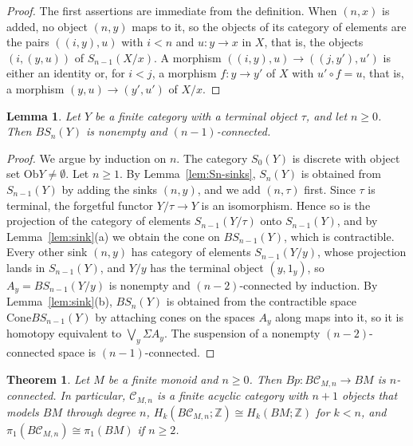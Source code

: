 \documentclass[12pt]{amsart}
\newtheorem{theorem}[teo]{Theorem}
\newtheorem{lemma}[teo]{Lemma}
\theoremstyle{definition}
\theoremstyle{remark}
\newcommand{\CC}{\mathcal{C}}
\newcommand{\co}{\colon}
\newcommand{\Ob}{\mathrm{Ob}}
\newcommand{\Z}{\mathbb{Z}}
\newcommand{\cone}{\mathrm{Cone}}
\begin{document}
\begin{proof}
The first assertions are immediate from the definition. When $(n,x)$ is added, no object $(n,y)$ maps to it, so the objects of its category of elements are the pairs $((i,y),u)$ with $i<n$ and $u\co y\to x$ in $X$, that is, the objects $(i,(y,u))$ of $S_{n-1}(X/x)$. A morphism $((i,y),u)\to((j,y'),u')$ is either an identity or, for $i<j$, a morphism $f\co y\to y'$ of $X$ with $u'\circ f=u$, that is, a morphism $(y,u)\to(y',u')$ of $X/x$.
\end{proof}

\begin{lemma}\label{lem:Sn-connected}
Let $Y$ be a finite category with a terminal object $\tau$, and let $n\ge0$. Then $BS_n(Y)$ is nonempty and $(n-1)$-connected.
\end{lemma}

\begin{proof}
We argue by induction on $n$. The category $S_0(Y)$ is discrete with object set $\Ob Y\neq\emptyset$. Let $n\ge1$. By Lemma~\ref{lem:Sn-sinks}, $S_n(Y)$ is obtained from $S_{n-1}(Y)$ by adding the sinks $(n,y)$, and we add $(n,\tau)$ first. Since $\tau$ is terminal, the forgetful functor $Y/\tau\to Y$ is an isomorphism. Hence so is the projection of the category of elements $S_{n-1}(Y/\tau)$ onto $S_{n-1}(Y)$, and by Lemma~\ref{lem:sink}(a) we obtain the cone on $BS_{n-1}(Y)$, which is contractible. Every other sink $(n,y)$ has category of elements $S_{n-1}(Y/y)$, whose projection lands in $S_{n-1}(Y)$, and $Y/y$ has the terminal object $(y,1_y)$, so $A_y=BS_{n-1}(Y/y)$ is nonempty and $(n-2)$-connected by induction. By Lemma~\ref{lem:sink}(b), $BS_n(Y)$ is obtained from the contractible space $\cone BS_{n-1}(Y)$ by attaching cones on the spaces $A_y$ along maps into it, so it is homotopy equivalent to $\bigvee_y\Sigma A_y$. The suspension of a nonempty $(n-2)$-connected space is $(n-1)$-connected.
\end{proof}

\begin{theorem}\label{thm:monoids}
Let $M$ be a finite monoid and $n\ge0$. Then $Bp\co B\CC_{M,n}\to BM$ is $n$-connected. In particular, $\CC_{M,n}$ is a finite acyclic category with $n+1$ objects that models $BM$ through degree $n$, $H_k(B\CC_{M,n};\Z)\cong H_k(BM;\Z)$ for $k<n$, and $\pi_1(B\CC_{M,n})\cong\pi_1(BM)$ if $n\ge2$.
\end{theorem}
\end{document}

